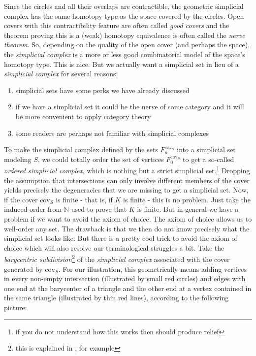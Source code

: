 Since the circles and all their overlaps are contractible, the geometric simplicial complex has the same homotopy type as the space covered by the circles.
Open covers with this contractibility feature are often called \textit{good covers} and the theorem proving this is a (weak) homotopy equivalence is often called the \textit{nerve theorem}.
So, depending on the quality of the open cover (and perhaps the space), the \textit{simplicial complex} is a more or less good combinatorial model of the space's homotopy type.
This is nice.
But we actually want a simplicial set in lieu of a \textit{simplicial complex} for several reasons:
\begin{enumerate}
\item[$\bullet$]
simplicial sets have some perks we have already discussed
\item[$\bullet$]
if we have a simplicial set it could be the nerve of some category and it will be more convenient to apply category theory
\item[$\bullet$]
some readers are perhaps not familiar with simplicial complexes
\end{enumerate}
To make the simplicial complex defined by the sets $F_{n}^{\mathrm{cov}_{S}}$ into a simplicial set modeling $S$, we could totally order the set of vertices $F_{0}^{\mathrm{cov}_{S}}$ to get a so-called \textit{ordered simplicial complex}, which is nothing but a strict simplicial set.\footnote{if you do not understand how this works then \cite{4dd1b85f} should produce relief} Dropping the assumption that intersections can only involve different members of the cover yields precisely the degeneracies that we are missing to get a simplicial set.
Now, if the cover $\mathrm{cov}_{S}$ is finite - that is, if $K$ is finite - this is no problem.
Just take the induced order from $\mathbb{N}$ used to prove that $K$ is finite.
But in general we have a problem if we want to avoid the axiom of choice.
The axiom of choice allows us to well-order any set.
The drawback is that we then do not know precisely what the simplicial set looks like.
But there is a pretty cool trick to avoid the axiom of choice which will also resolve our terminological struggles a bit.
Take the \textit{barycentric subdivision}\footnote{this is explained in \cite{8b5861fc}, for example} of the \textit{simplicial complex} associated with the cover generated by $\mathrm{cov}_{S}$.
For our illustration, this geometrically means adding vertices in every non-empty intersection (illustrated by small red circles) and edges with one end at the barycenter of a triangle and the other end at a vertex contained in the same triangle (illustrated by thin red lines), according to the following picture:
